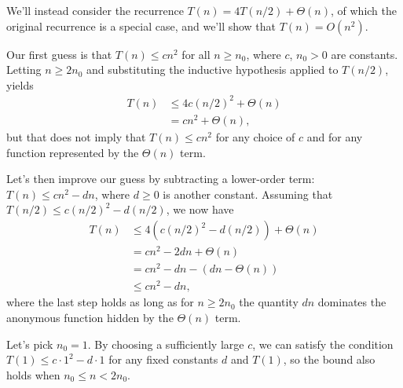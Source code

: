 We'll instead consider the recurrence $T(n)=4T(n/2)+\Theta(n)$, of which the original recurrence is a special case, and we'll show that $T(n)=O(n^2)$.

Our first guess is that $T(n)\le cn^2$ for all $n\ge n_0$, where $c$, $n_0>0$ are constants.
Letting $n\ge2n_0$ and substituting the inductive hypothesis applied to $T(n/2)$, yields
\begin{align*}
    T(n) &\le 4c(n/2)^2+\Theta(n) \\
    &= cn^2+\Theta(n),
\end{align*}
but that does not imply that $T(n)\le cn^2$ for any choice of $c$ and for any function represented by the $\Theta(n)$ term.

Let's then improve our guess by subtracting a lower-order term: $T(n)\le cn^2-dn$, where $d\ge0$ is another constant.
Assuming that $T(n/2)\le c(n/2)^2-d(n/2)$, we now have
\begin{align*}
    T(n) &\le 4(c(n/2)^2-d(n/2))+\Theta(n) \\
    &= cn^2-2dn+\Theta(n) \\
    &= cn^2-dn-(dn-\Theta(n)) \\
    &\le cn^2-dn,
\end{align*}
where the last step holds as long as for $n\ge2n_0$ the quantity $dn$ dominates the anonymous function hidden by the $\Theta(n)$ term.

Let's pick $n_0=1$.
By choosing a sufficiently large $c$, we can satisfy the condition $T(1)\le c\cdot1^2-d\cdot1$ for any fixed constants $d$ and $T(1)$, so the bound also holds when $n_0\le n<2n_0$.

